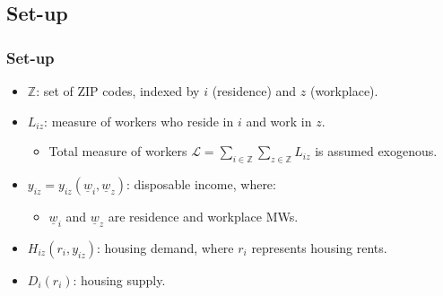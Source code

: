 \subsection{Set-up}
\begin{frame}
	\frametitle{Set-up}
	
	
	\begin{itemize}
		\item $\mathbb{Z}$: set of ZIP codes, indexed by $i$ (residence) and $z$ 
		(workplace).
		
		\pause
		\vspace{2mm}
		\item $L_{i z}$: measure of workers who reside in $i$ and work in $z$.
		\begin{itemize}
			\item Total measure of workers $\mathcal{L}=\sum_{i \in \mathbb{Z}} 
			\sum_{z \in \mathbb{Z}} L_{i z} $ is assumed exogenous.
		\end{itemize}
	
		\pause
		\vspace{2mm}
		\item $y_{i z} = y_{i z} \left(\underline{w}_i, \underline{w}_z\right)$: 
		disposable income, where:
		\begin{itemize}
			\item $\underline{w}_i$ and $\underline{w}_z$ are residence and 
			workplace MWs.
		\end{itemize}
	
		\pause
		\vspace{2mm}
		\item $H_{i z} \left(r_i, y_{i z} \right)$: housing demand, where $r_i$ 
		represents housing rents.
		
		\pause
		\vspace{2mm}
		\item $D_i \left(r_i \right)$: housing supply.
	\end{itemize}
	
\end{frame}


